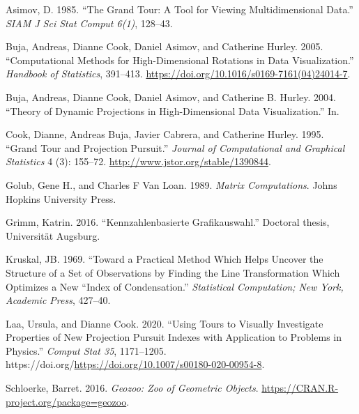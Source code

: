\hypertarget{refs}{}
\begin{CSLReferences}{1}{0}
\leavevmode{}%
Asimov, D. 1985. {``The Grand Tour: A Tool for Viewing Multidimensional Data.''} \emph{SIAM J Sci Stat Comput 6(1)}, 128--43.

\leavevmode{}%
Buja, Andreas, Dianne Cook, Daniel Asimov, and Catherine Hurley. 2005. {``Computational Methods for High-Dimensional Rotations in Data Visualization.''} \emph{Handbook of Statistics}, 391--413. \url{https://doi.org/10.1016/s0169-7161(04)24014-7}.

\leavevmode{}%
Buja, Andreas, Dianne Cook, Daniel Asimov, and Catherine B. Hurley. 2004. {``Theory of Dynamic Projections in High-Dimensional Data Visualization.''} In.

\leavevmode{}%
Cook, Dianne, Andreas Buja, Javier Cabrera, and Catherine Hurley. 1995. {``Grand Tour and Projection Pursuit.''} \emph{Journal of Computational and Graphical Statistics} 4 (3): 155--72. \url{http://www.jstor.org/stable/1390844}.

\leavevmode{}%
Golub, Gene H., and Charles F Van Loan. 1989. \emph{Matrix Computations}. Johns Hopkins University Press.

\leavevmode{}%
Grimm, Katrin. 2016. {``Kennzahlenbasierte Grafikauswahl.''} Doctoral thesis, Universit{ä}t Augsburg.

\leavevmode{}%
Kruskal, JB. 1969. {``Toward a Practical Method Which Helps Uncover the Structure of a Set of Observations by Finding the Line Transformation Which Optimizes a New ``Index of Condensation.''} \emph{Statistical Computation; New York, Academic Press}, 427--40.

\leavevmode{}%
Laa, Ursula, and Dianne Cook. 2020. {``Using Tours to Visually Investigate Properties of New Projection Pursuit Indexes with Application to Problems in Physics.''} \emph{Comput Stat 35}, 1171--1205. https://doi.org/\url{https://doi.org/10.1007/s00180-020-00954-8}.

\leavevmode{}%
Schloerke, Barret. 2016. \emph{Geozoo: Zoo of Geometric Objects}. \url{https://CRAN.R-project.org/package=geozoo}.

\end{CSLReferences}


